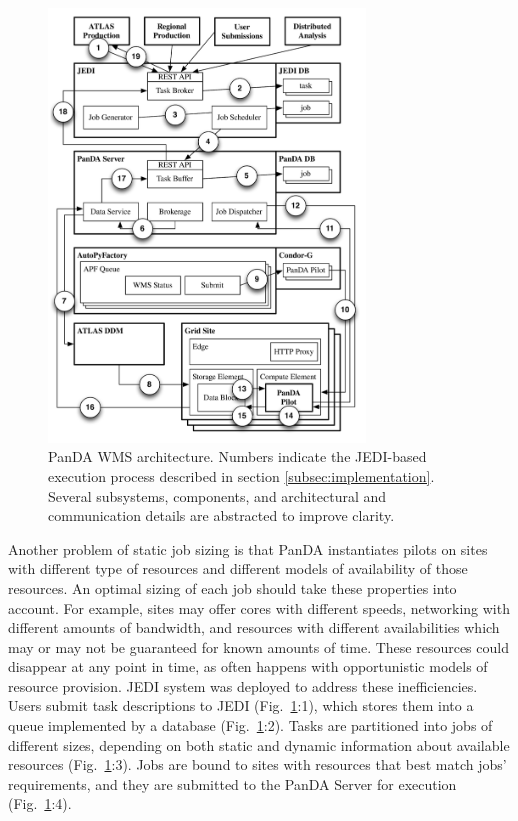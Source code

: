 \begin{figure}
  \includegraphics[width=0.75\textwidth]{images/Figure_1_placeholder.png}
\caption{PanDA WMS architecture. Numbers indicate the JEDI-based execution
process described in section \ref{subsec:implementation}. Several subsystems,
components, and architectural and communication details are abstracted to
improve clarity.}
\label{fig:architecture}
\end{figure}


Another problem of static job sizing is that PanDA instantiates pilots on
sites with different type of resources and different models of availability
of those resources. An optimal sizing of each job should take these
properties into account. For example, sites may offer cores with different
speeds, networking with different amounts of bandwidth, and resources with
different availabilities which may or may not be guaranteed for known amounts
of time. These resources could disappear at any point in time, as often
happens with opportunistic models of resource provision. JEDI system was
deployed to address these inefficiencies. Users submit task descriptions to
JEDI (Fig.~\ref{fig:architecture}:1), which stores them into a queue
implemented by a database (Fig.~\ref{fig:architecture}:2). Tasks are
partitioned into jobs of different sizes, depending on both static and
dynamic information about available resources
(Fig.~\ref{fig:architecture}:3). Jobs are bound to sites with resources that
best match jobs' requirements, and they are submitted to the PanDA Server for
execution (Fig.~\ref{fig:architecture}:4).

